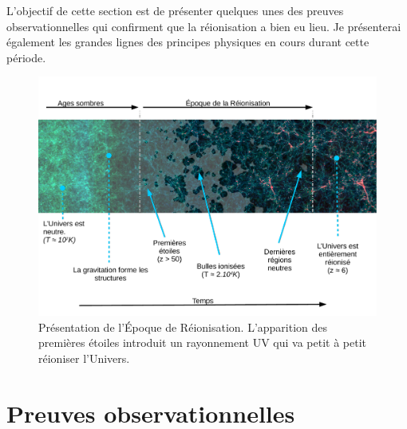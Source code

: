 L'objectif de cette section est de présenter quelques unes des preuves observationnelles qui confirment que la réionisation a bien eu lieu.
Je présenterai également les grandes lignes des principes physiques en cours durant cette période.




\begin{figure}
\centering
        \includegraphics[width=\textwidth]{img/01/frise_legend.pdf} 
        \caption[Présentation de l'EoR]{Présentation de l'Époque de Réionisation. 
        L'apparition des premières étoiles introduit un rayonnement UV qui va petit à petit réioniser l'Univers.}
 		\label{fig:frise}
\end{figure}


\section{Preuves observationnelles}
\label{sec_contraintes_obs}

